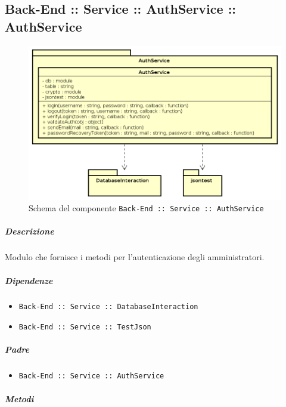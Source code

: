 \documentclass[../ManualeSviluppatore_v1.0.0.tex]{subfiles}
\begin{document}
\subsection{Back-End :: Service :: AuthService :: AuthService}
\begin{figure}[!h]
	\centering
	\includegraphics[scale=0.6]{Architettura/Back-End/Service/AuthService.png}
	\caption{Schema del componente \texttt{Back-End :: Service :: AuthService}}
\end{figure}
\subparagraph{Descrizione} Modulo che fornisce i metodi per l'autenticazione degli amministratori.
\subparagraph{Dipendenze}
\begin{itemize}
	\item \texttt{Back-End :: Service :: DatabaseInteraction}
	\item \texttt{Back-End :: Service :: TestJson}
\end{itemize}
\subparagraph{Padre}
\begin{itemize}
	\item \texttt{Back-End :: Service :: AuthService}
\end{itemize}
\subparagraph{Metodi}
\end{document}
